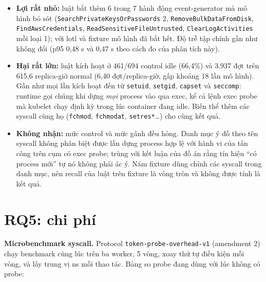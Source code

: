\begin{itemize}
\tightlist
\item
  \textbf{Lợi rất nhỏ:} luật bắt thêm 6 trong 7 hành động event-generator mà mô hình bỏ sót (\texttt{Search\allowbreak{}Private\allowbreak{}Keys\allowbreak{}Or\allowbreak{}Passwords} 2, \texttt{Remove\allowbreak{}Bulk\allowbreak{}Data\allowbreak{}From\allowbreak{}Disk}, \texttt{Find\allowbreak{}Aws\allowbreak{}Credentials}, \texttt{Read\allowbreak{}Sensitive\allowbreak{}File\allowbreak{}Untrusted}, \texttt{Clear\allowbreak{}Log\allowbreak{}Activities} mỗi loại 1); với lotl và fixture mô hình đã bắt hết. Độ trễ tập chính gần như không đổi (p95 0,48 s và 0,47 s theo cách đo của phân tích này).
\item
  \textbf{Hại rất lớn:} luật kích hoạt ở 461/694 control idle (66,4\%) và 3.937 đợt trên 615,6 replica-giờ normal (6,40 đợt/replica-giờ, gấp khoảng 18 lần mô hình). Gần như mọi lần kích hoạt đến từ \texttt{setuid}, \texttt{setgid}, \texttt{capset} và \texttt{seccomp}: runtime gọi chúng khi dựng \emph{mọi} process vào qua exec, kể cả lệnh exec probe mà kubelet chạy định kỳ trong lúc container đang idle. Biến thể thêm các syscall cùng họ (\texttt{fchmod}, \texttt{fchmodat}, \texttt{setres*}\ldots) cho cùng kết quả.
\item
  \textbf{Không nhận:} mức control và mức gánh đều hỏng. Danh mục ý đồ theo tên syscall không phân biệt được lần dựng process hợp lệ với hành vi của tấn công trên cụm có exec probe; trùng với kết luận của đồ án rằng tín hiệu ``có process mới'' tự nó không phải ác ý. Năm fixture dùng chính các syscall trong danh mục, nên recall của luật trên fixture là vòng tròn và không được tính là kết quả.
\end{itemize}

\section{RQ5: chi phí}\label{sec:overhead}

\textbf{Microbenchmark syscall.} Protocol \texttt{token-\allowbreak{}probe-\allowbreak{}overhead-\allowbreak{}v1} (amendment 2) chạy benchmark cùng lúc trên ba worker, 5 vòng, xoay thứ tự điều kiện mỗi vòng, và lấy trung vị ns mỗi thao tác. Bảng so probe đang dùng với lúc không có probe:

